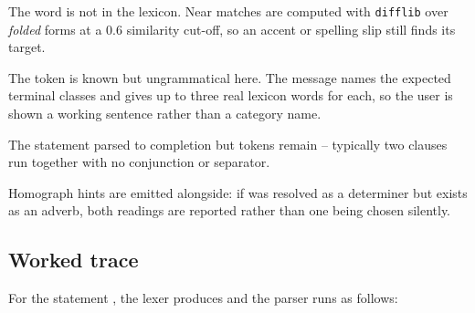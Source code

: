 \begin{description}[leftmargin=1.4em, style=nextline, font=\ttfamily]
  \item[unknown\_word] The word is not in the lexicon. Near matches are computed with
        \texttt{difflib} over \emph{folded} forms at a 0.6 similarity cut-off, so an accent
        or spelling slip still finds its target.
  \item[unexpected\_token] The token is known but ungrammatical here. The message names the
        expected terminal classes and gives up to three real lexicon words for each, so the
        user is shown a working sentence rather than a category name.
  \item[trailing\_input] The statement parsed to completion but tokens remain --
        typically two clauses run together with no conjunction or separator.
\end{description}

Homograph hints are emitted alongside: if  was resolved as a determiner but 
exists as an adverb, both readings are reported rather than one being chosen silently.

\subsection{Worked trace}

For the statement , the lexer produces
 and the parser runs as follows:

